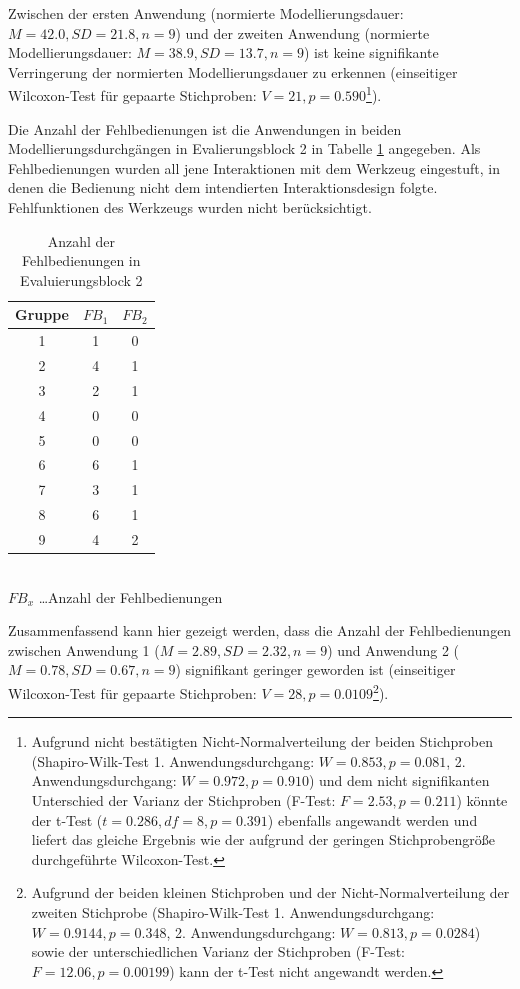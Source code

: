 Zwischen der ersten Anwendung (normierte Modellierungsdauer: $M=42.0, SD=21.8, n=9$) und der zweiten Anwendung (normierte Modellierungsdauer: $M=38.9, SD=13.7, n=9$) ist keine signifikante Verringerung der normierten Modellierungsdauer zu erkennen (einseitiger Wilcoxon-Test für gepaarte Stichproben: $V=21, p=0.590$\footnote{Aufgrund nicht bestätigten Nicht-Normalverteilung der beiden Stichproben (Shapiro-Wilk-Test 1. Anwendungsdurchgang: $W=0.853, p=0.081$, 2. Anwendungsdurchgang: $W=0.972, p=0.910$) und dem nicht signifikanten Unterschied der Varianz der Stichproben (F-Test: $F=2.53, p=0.211$) könnte der t-Test ($t=0.286, df=8, p=0.391$) ebenfalls angewandt werden und liefert das gleiche Ergebnis wie der aufgrund der geringen Stichprobengröße durchgeführte Wilcoxon-Test.}).

Die Anzahl der Fehlbedienungen ist die Anwendungen in beiden Modellierungsdurchgängen in Evalierungsblock 2 in Tabelle \ref{tab:fehlbedienungen} angegeben. Als Fehlbedienungen wurden all jene Interaktionen mit dem Werkzeug eingestuft, in denen die Bedienung nicht dem intendierten Interaktionsdesign folgte. Fehlfunktionen des Werkzeugs wurden nicht berücksichtigt.

\begin{table}[htbp]
	\centering
	\caption{Anzahl der Fehlbedienungen in Evaluierungsblock 2}
\begin{tabular}{| c || c | c |}
  \hline
   Gruppe    & $FB_{1}$ & $FB_{2}$ \\ \hline
   1     & 1 & 0 \\ 
   2     & 4 & 1 \\ 
   3     & 2 & 1 \\ 
   4     & 0 & 0 \\ 
   5     & 0 & 0 \\ 
   6     & 6 & 1 \\ 
   7     & 3 & 1 \\ 
   8     & 6 & 1 \\ 
   9     & 4 & 2 \\ \hline
\end{tabular} \\
\footnotesize $FB_{x}$ \ldots Anzahl der Fehlbedienungen
	\label{tab:fehlbedienungen}
\end{table}

Zusammenfassend kann hier gezeigt werden, dass die Anzahl der Fehlbedienungen zwischen Anwendung 1 ($M=2.89, SD=2.32, n=9$) und Anwendung 2 ($M=0.78, SD=0.67, n=9$) signifikant geringer geworden ist (einseitiger Wilcoxon-Test für gepaarte Stichproben: $V=28, p=0.0109$\footnote{Aufgrund der beiden kleinen Stichproben und der Nicht-Normalverteilung der zweiten Stichprobe (Shapiro-Wilk-Test 1. Anwendungsdurchgang: $W=0.9144, p=0.348$, 2. Anwendungsdurchgang: $W=0.813, p=0.0284$) sowie der unterschiedlichen Varianz der Stichproben (F-Test: $F=12.06, p=0.00199$) kann der t-Test nicht angewandt werden.}).


